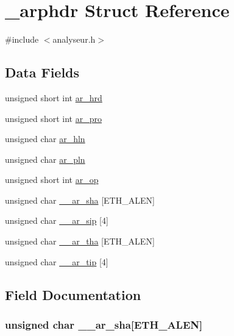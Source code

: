 \hypertarget{struct__arphdr}{}\section{\+\_\+arphdr Struct Reference}
\label{struct__arphdr}


{\ttfamily \#include $<$analyseur.\+h$>$}

\subsection*{Data Fields}
\begin{DoxyCompactItemize}
\item 
unsigned short int \hyperlink{struct__arphdr_a9a4900036e97634892020b0e6e4d838d}{ar\+\_\+hrd}
\item 
unsigned short int \hyperlink{struct__arphdr_a6740bfa6a87474b777a9ee7d592c777c}{ar\+\_\+pro}
\item 
unsigned char \hyperlink{struct__arphdr_a73474b854395cbd318425b9155bc04c3}{ar\+\_\+hln}
\item 
unsigned char \hyperlink{struct__arphdr_a2d8f7b178fa0a800527c502dd398abb0}{ar\+\_\+pln}
\item 
unsigned short int \hyperlink{struct__arphdr_a35a7ee09725d99049429b6f525308ec2}{ar\+\_\+op}
\item 
unsigned char \hyperlink{struct__arphdr_ae9756cf98548a5e398d0b6155e5f336b}{\+\_\+\+\_\+ar\+\_\+sha} \mbox{[}E\+T\+H\+\_\+\+A\+L\+EN\mbox{]}
\item 
unsigned char \hyperlink{struct__arphdr_a530086a0ce8b2331ffe91053002a668d}{\+\_\+\+\_\+ar\+\_\+sip} \mbox{[}4\mbox{]}
\item 
unsigned char \hyperlink{struct__arphdr_af761f223662d24799a5d83827e62850e}{\+\_\+\+\_\+ar\+\_\+tha} \mbox{[}E\+T\+H\+\_\+\+A\+L\+EN\mbox{]}
\item 
unsigned char \hyperlink{struct__arphdr_a46c01e115912e6dad444b9eaf92d65b1}{\+\_\+\+\_\+ar\+\_\+tip} \mbox{[}4\mbox{]}
\end{DoxyCompactItemize}


\subsection{Field Documentation}
\subsubsection[{\texorpdfstring{\+\_\+\+\_\+ar\+\_\+sha}{__ar_sha}}]{\setlength{\rightskip}{0pt plus 5cm}unsigned char \+\_\+\+\_\+ar\+\_\+sha\mbox{[}E\+T\+H\+\_\+\+A\+L\+EN\mbox{]}}\hypertarget{struct__arphdr_ae9756cf98548a5e398d0b6155e5f336b}{}\label{struct__arphdr_ae9756cf98548a5e398d0b6155e5f336b}
